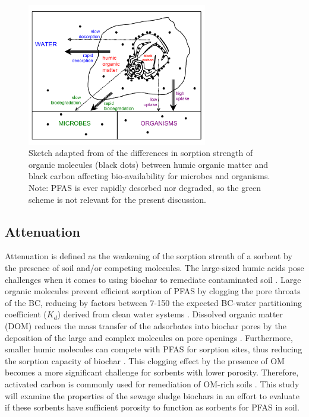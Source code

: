 \begin{figure}[htb]
    \centering
    \includegraphics[width=0.7\textwidth]{Diagrams/Cornelissen_sorption.pdf}
    \caption{Sketch adapted from \cite{Cornelissen2005} of the differences in sorption strength of organic molecules (black dots) between humic organic matter and black carbon affecting bio-availability for microbes and organisms. Note: PFAS is ever rapidly desorbed nor degraded, so the green scheme is not relevant for the present discussion.}
    \label{fig:cornelissen_sorption}
\end{figure}

\subsection{Attenuation}
Attenuation is defined as the weakening of the sorption strenth of a sorbent by the presence of soil and/or competing molecules. The large-sized humic acids pose challenges when it comes to using biochar to remediate contaminated soil  \citep{mahinroosta2020review}. Large organic molecules prevent efficient sorption of PFAS by clogging the pore throats of the BC, reducing by factors between 7-150 the expected BC-water partitioning coefficient ($K_d$) derived from clean water systems \citep{hale2009sorption, Teixido2013, cornelissen2004sorption}. Dissolved organic matter (DOM) reduces the mass transfer of the adsorbates into biochar pores by the deposition of the large and complex molecules on pore openings \citep{pignatello2006effect}. Furthermore, smaller humic molecules can compete with PFAS for sorption sites, thus reducing the sorption capacity of biochar \citep{du2014adsorption}. This clogging effect by the presence of OM becomes a more significant challenge for sorbents with lower porosity. Therefore, activated carbon is commonly used for remediation of OM-rich soils \citep{Sormo2021}. This study will examine the properties of the sewage sludge biochars in an effort to evaluate if these sorbents have sufficient porosity to function as sorbents for PFAS in soil. 

